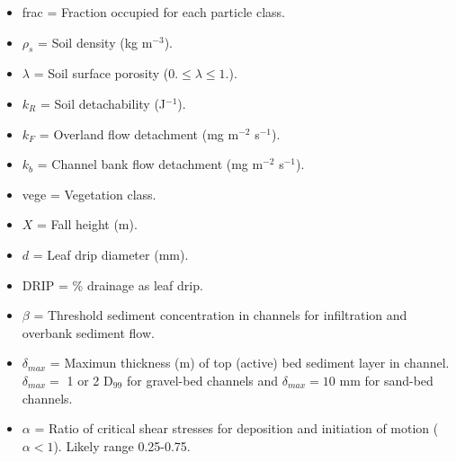 \documentclass[12pt, letterpaper]{article}
\newcounter{ResumeEnumerate}
\begin{document}
{\tiny
\begin{itemize}[label={}]
\item frac = Fraction occupied for each particle class.
\item $\rho_s$ =  Soil density (kg m$^{-3}$).
\item $\lambda$ = Soil surface porosity ($0. \leq \lambda \leq 1.$).
\item $k_R$ = Soil detachability  (J$^{-1}$).
\item $k_F$ = Overland flow detachment (mg m$^{-2}$ s$^{-1}$).
\item $k_b$ = Channel bank flow detachment (mg m$^{-2}$ s$^{-1}$).
\item vege = Vegetation class.
\item $X$ =  Fall height (m).
\item $d$ = Leaf drip diameter (mm).
\item DRIP = \% drainage as leaf drip.
\item $\beta$ = Threshold sediment concentration in channels for infiltration and overbank sediment flow.
\item $\delta_{max}$ = Maximun thickness (m) of top (active) bed sediment layer in channel. $\delta_{max} = $ 1 or 2 D$_99$ for gravel-bed channels and $\delta_{max} = 10$ mm for sand-bed channels.
\item $\alpha$ = Ratio of critical shear stresses for deposition and initiation of motion ($\alpha < 1$). Likely range 0.25-0.75.
\end{itemize}
}

\end{document}
